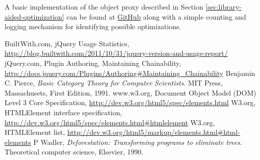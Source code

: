 \documentclass[preprint, leqno]{sigplanconf}
\begin{document}
A basic implementation of the object proxy described in Section \ref{sec:library-aided-optimization} can be found at \href{https://github.com/johnbender/jquery-lazy-proxy/blob/79ab61e22547169d6f392512f782df2e29362ebc/lazy.js}{GitHub} along with a simple counting and logging mechanism for identifying possible optimizations.




\begin{thebibliography}{}
\softraggedright

  BuiltWith.com,
  jQuery Usage Statistics,
  \url{http://blog.builtwith.com/2011/10/31/jquery-version-and-usage-report/}
  jQuery.com,
  Plugin Authoring,
  Maintaining Chainability,
  \url{http://docs.jquery.com/Plugins/Authoring#Maintaining_Chainability}
  Benjamin C. Pierce,
  \emph{Basic Category Theory for Computer Scientists}.
  MIT Press, Massachusets,
  First Edition,
  1991.
  www.w3.org,
  Document Object Model (DOM) Level 3 Core Specification,
  \url{http://dev.w3.org/html5/spec/elements.html}
  W3.org,
  HTMLElement interface specification,
  \url{http://dev.w3.org/html5/spec/elements.html#htmlelement}
  W3.org,
  HTMLElement list,
  \url{http://dev.w3.org/html5/markup/elements.html#html-elements}
  P Wadler,
  \emph{Deforestation: Transforming programs to eliminate trees}.
  Theoretical computer science,
  Elsevier,
  1990.

\end{thebibliography}
\end{document}
